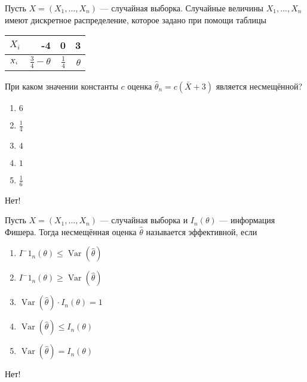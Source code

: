 \documentclass[t]{beamer}
\DeclareMathOperator{\Var}{Var}
\let\P\relax
\DeclareMathOperator{\P}{\mathbb{P}}
\begin{document}
 \begin{frame} \label{48-No} 
\begin{block}{48} 

Пусть $X = (X_1, \ldots , X_n)$ — случайная выборка. Случайные величины $X_1, ... , X_n$ имеют дискретное распределение, которое задано при помощи таблицы

\begin{center}
\begin{tabular}{lrrr} \toprule
$X_i$  & -4 & 0 & 3 \\
\midrule
$\P_{X_i}$ & $\frac{3}{4} - \theta$ & $\frac{1}{4}$ & $\theta$\\
\bottomrule
\end{tabular}
\end{center}

При каком значении константы $c$ оценка  $\hat{\theta}_n = c (\bar{X} + 3)$ является несмещённой?
  


 \end{block} 
\begin{enumerate} 
\item[] \hyperlink{48-No}{\beamergotobutton{} $6$}
\item[] \hyperlink{48-No}{\beamergotobutton{} $\frac{1}{4}$}
\item[] \hyperlink{48-No}{\beamergotobutton{} $4$}
\item[] \hyperlink{48-No}{\beamergotobutton{} $1$}
\item[] \hyperlink{48-Yes}{\beamergotobutton{} $\frac{1}{6}$}
\end{enumerate} 

 \alert{Нет!} 
\end{frame} 


 \begin{frame} \label{49-No} 
\begin{block}{49} 

Пусть $X = (X_1, \ldots , X_n)$ — случайная выборка и $I_n(\theta)$ — информация Фишера. Тогда несмещённая оценка $\hat{\theta}$ называется эффективной, если
  


 \end{block} 
\begin{enumerate} 
\item[] \hyperlink{49-No}{\beamergotobutton{} $I^-1_n (\theta) \leq \Var(\hat\theta)$}
\item[] \hyperlink{49-No}{\beamergotobutton{} $I^-1_n (\theta) \geq \Var(\hat\theta)$}
\item[] \hyperlink{49-Yes}{\beamergotobutton{} $\Var(\hat\theta) \cdot I_n (\theta) = 1$}
\item[] \hyperlink{49-No}{\beamergotobutton{} $\Var(\hat\theta) \leq I_n (\theta)$}
\item[] \hyperlink{49-No}{\beamergotobutton{} $\Var(\hat\theta) = I_n (\theta)$}
\end{enumerate} 

 \alert{Нет!} 
\end{frame} 
\end{document}
